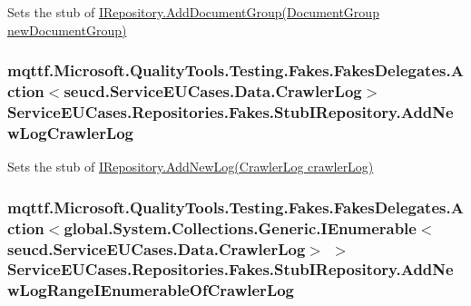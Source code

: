 Sets the stub of \hyperlink{interface_service_e_u_cases_1_1_repositories_1_1_i_repository_a1dc7e14bffc195cc3fc51df35128064c}{I\-Repository.\-Add\-Document\-Group(\-Document\-Group new\-Document\-Group)}

\hypertarget{class_service_e_u_cases_1_1_repositories_1_1_fakes_1_1_stub_i_repository_a8224a399eea01e43904e7c62c6a4044a}{
\subsubsection[{Add\-New\-Log\-Crawler\-Log}]{\setlength{\rightskip}{0pt plus 5cm}mqttf.\-Microsoft.\-Quality\-Tools.\-Testing.\-Fakes.\-Fakes\-Delegates.\-Action$<$seucd.\-Service\-E\-U\-Cases.\-Data.\-Crawler\-Log$>$ Service\-E\-U\-Cases.\-Repositories.\-Fakes.\-Stub\-I\-Repository.\-Add\-New\-Log\-Crawler\-Log}}\label{class_service_e_u_cases_1_1_repositories_1_1_fakes_1_1_stub_i_repository_a8224a399eea01e43904e7c62c6a4044a}


Sets the stub of \hyperlink{interface_service_e_u_cases_1_1_repositories_1_1_i_repository_af8b3072d0263cf8cd3e6175577938fa3}{I\-Repository.\-Add\-New\-Log(\-Crawler\-Log crawler\-Log)}

\hypertarget{class_service_e_u_cases_1_1_repositories_1_1_fakes_1_1_stub_i_repository_ad1353a1205f37f0aa6a6844ffd373580}{
\subsubsection[{Add\-New\-Log\-Range\-I\-Enumerable\-Of\-Crawler\-Log}]{\setlength{\rightskip}{0pt plus 5cm}mqttf.\-Microsoft.\-Quality\-Tools.\-Testing.\-Fakes.\-Fakes\-Delegates.\-Action$<$global.\-System.\-Collections.\-Generic.\-I\-Enumerable$<$seucd.\-Service\-E\-U\-Cases.\-Data.\-Crawler\-Log$>$ $>$ Service\-E\-U\-Cases.\-Repositories.\-Fakes.\-Stub\-I\-Repository.\-Add\-New\-Log\-Range\-I\-Enumerable\-Of\-Crawler\-Log}}\label{class_service_e_u_cases_1_1_repositories_1_1_fakes_1_1_stub_i_repository_ad1353a1205f37f0aa6a6844ffd373580}


